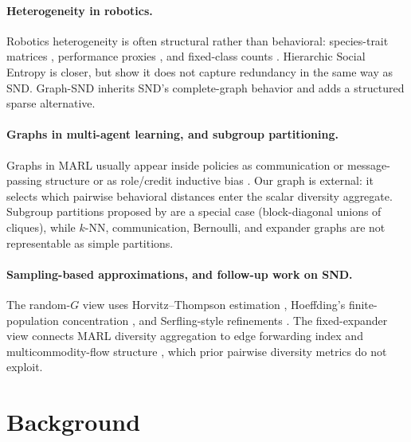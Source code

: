\documentclass{article}
\theoremstyle{plain}
\theoremstyle{definition}
\theoremstyle{remark}
\begin{document}
\paragraph{Heterogeneity in robotics.}
Robotics heterogeneity is often structural rather than behavioral:
species-trait matrices \citep{prorok2017impact}, performance proxies
\citep{li2004learning}, and fixed-class counts \citep{twu2014measure}.
Hierarchic Social Entropy \citep{balch2000hse} is closer, but
\citet{bettini2025snd} show it does not capture redundancy in the same
way as SND. Graph-SND inherits SND's complete-graph behavior and adds a
structured sparse alternative.

\paragraph{Graphs in multi-agent learning, and subgroup partitioning.}
Graphs in MARL usually appear inside policies as communication or
message-passing structure
\citep{sukhbaatar2016learning,blumenkamp2021emergence,bettini2023hetgppo}
or as role/credit inductive bias \citep{wang2020roma,wang2021rode}. Our
graph is external: it selects which pairwise behavioral distances enter
the scalar diversity aggregate. Subgroup partitions proposed by
\citet[\S6]{bettini2025snd} are a special case (block-diagonal unions of
cliques), while $k$-NN, communication, Bernoulli, and expander graphs are
not representable as simple partitions.

\paragraph{Sampling-based approximations, and follow-up work on SND.}
The random-$G$ view uses Horvitz--Thompson estimation
\citep{horvitz1952generalization}, Hoeffding's finite-population
concentration \citep{hoeffding1948class,hoeffding1963probability}, and
Serfling-style refinements \citep{serfling1974probability,bardenet2015concentration}.
The fixed-expander view connects MARL diversity aggregation to edge
forwarding index and multicommodity-flow structure
\citep{chung1987forwarding,heydemann1989forwarding,leighton1999multicommodity},
which prior pairwise diversity metrics do not exploit.

\section{Background}
\label{sec:background}
\end{document}
